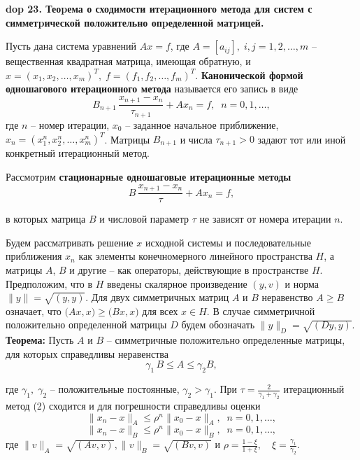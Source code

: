 \setcounter{section}{4}
\setcounter{subsection}{23}
\setcounter{equation}{0}
\textbf{\LARGE dop 23. Теоpема о сходимости итеpационного метода для систем с симметpической положительно   опpеделенной матpицей.}

Пусть дана система уравнений $A x = f$,
где $A = [a_{ij}], \; i, j = 1,2,\ldots, m$ -- вещественная квадратная матрица, имеющая обратную, и $x = (x_1, x_2, \ldots, x_m)^T, \; f = (f_1, f_2, \ldots, f_m)^T$. \textbf{Канонической формой одношагового итерационного метода} называется его запись в виде 
$$
B_{n+1}\, \frac{x_{n+1} - x_{n}}{\tau_{n+1}} + A x_n = f, \;\; n = 0, 1, \ldots,
$$
где $n$ -- номер итерации, $x_0$ -- заданное начальное приближение, $x_n = (x_1^n, x_2^n, \ldots, x_m^n)^T$. Матрицы $B_{n+1}$ и числа $\tau_{n+1} > 0$ задают тот или иной конкретный итерационный метод.

Рассмотрим \textbf{стационарные одношаговые итерационные методы}
\begin{equation}
    B\, \frac{x_{n+1} - x_{n}}{\tau} + A x_n = f, 
    \tag{2}
\end{equation}

в которых матрица $B$ и числовой параметр $\tau$ не зависят от номера итерации $n$.

Будем рассматривать решение $x$ исходной системы  и последовательные приближения $x_n$ как элементы конечномерного линейного пространства $H$, а матрицы $A$, $B$ и другие -- как операторы, действующие в пространстве $H$. 
Предположим, что в $H$ введены скалярное произведение $(y, v)$ и норма $\|y\| = \sqrt{(y, y)}$. 
Для двух симметричных матриц $A$ и $B$ неравенство $A \geq B$ означает, что $\big(A x, x\big) \geq \big(B x, x\big)$ для всех $x \in H$. 
В случае симметричной положительно определенной матрицы $D$ будем обозначать $\|y\|_D = \sqrt{(D y , y)}$.\\

\textbf{Теорема:\;} Пусть $A$ и $B$ -- симметричные положительно определенные матрицы, для которых справедливы неравенства
\begin{equation}\tag{3}
    \gamma_1 \,B \leq A \leq \gamma_2 B,
\end{equation}

где $\gamma_1, \;\gamma_2$ -- положительные постоянные, $\gamma_2 > \gamma_1$. При 
$
\tau = \frac{2}{\gamma_1 + \gamma_2}
$ 
итерационный метод (2) сходится и для погрешности справедливы оценки 
$$
\|x_n - x\|_A \leq \rho^n \|x_0 - x\|_A, \;\; n = 0, 1, \ldots,
$$
$$
\|x_n - x\|_B \leq \rho^n \|x_0 - x\|_B, \;\; n = 0, 1, \ldots,
$$
где $\|v\|_A = \sqrt{(A v, v)}, \|v\|_B = \sqrt{(B v, v)}$\; и 
$
\rho = \frac{1 - \xi}{1 + \xi}, \quad \xi = \frac{\gamma_1}{\gamma_2}.
$

